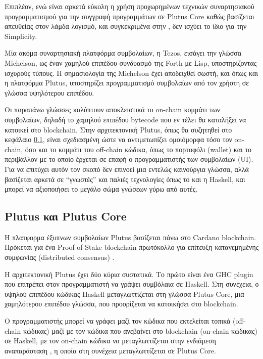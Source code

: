 Επιπλέον, ενώ είναι αρκετά εύκολη η χρήση προχωρημένων τεχνικών συναρτησιακού
προγραμματισμού για την συγγραφή προγραμμάτων σε Plutus Core καθώς βασίζεται
απευθείας στον λάμδα λογισμό, και συγκεκριμένα στην \FOM{}, δεν ισχύει το ίδιο
για την Simplicity.

Μία ακόμα συναρτησιακή πλατφόρμα συμβολαίων, η Tezos, εισάγει την γλώσσα
Michelson, ως έναν χαμηλού επιπέδου συνδυασμό της Forth με Lisp, υποστηρίζοντας
ισχυρούς τύπους.  Η σημασιολογία της Michelson έχει αποδειχθεί σωστή, και όπως
και η πλατφόρμα Plutus, υποστηρίζει προγραμματισμό συμβολαίων από τον χρήστη σε
γλώσσα υψηλότερου επιπέδου.

Οι παραπάνω γλώσσες καλύπτουν αποκλειστικά το on-chain κομμάτι των συμβολαίων,
δηλαδή το χαμηλού επιπέδου bytecode που εν τέλει θα καταλήξει να κατοικεί στο
blockchain. Στην αρχιτεκτονική Plutus, όπως θα συζητηθεί στο κεφάλαιο
\ref{subsec:plutus}, είναι σχεδιασμένη ώστε να αντιμετωπίζει ομοιόμορφα τόσο
τον on-chain, όσο και το κομμάτι του off-chain κώδικα, όπως το πορτοφόλι
(wallet) και το περιβάλλον με το οποίο έρχεται σε επαφή ο προγραμματιστής των
συμβολαίων (UI). Για να επιτύχει αυτόν τον σκοπό δεν επινοεί μια εντελώς
καινούργια γλώσσα, αλλά βασίζεται αρκετά σε ``γνωστές'' και παλιές τεχνολογίες
όπως το \FOM και η Haskell, και μπορεί να αξιοποιήσει το μεγάλο σώμα γνώσεων
γύρω από αυτές.

\subsection{Plutus και Plutus Core} \label{subsec:plutus}

Η πλατφορμα έξυπνων συμβολαίων Plutus βασίζεται πάνω στο Cardano blockchain.
Πρόκεται για ένα Proof-of-Stake blockchain πρωτόκολλο για επίτευξη
κατανεμημένης συμφωνίας (distributed consensus) \cite{ouroboros}.

Η αρχιτεκτονική Plutus έχει δύο κύρια συστατικά. Το πρώτο είναι ένα GHC plugin
που επιτρέπει στον προγραμματιστή να γράψει συμβόλαια σε Haskell.  Στη
συνέχεια, ο υψηλού επιπέδου κώδικας Haskell μεταγλωττίζεται στη γλώσσα Plutus
Core, μια χαμηλότερου επιπέδου γλώσσα, που προορίζεται να κατοικήσει στο
blockchain.

Ο προγραμματιστής μπορεί να γράφει μαζί τον κώδικα που εκτελείται τοπικά
(off-chain κώδικας) μαζί με τον κώδικα που ανεβαίνει στο blockchain (on-chain
κώδικας) σε Haskell, με τον on-chain κώδικα να μεταγλωττίζεται στην ενδιάμεση
αναπαράσταση \FIR{},  η οποία στη συνέχεια μεταγλωττίζεται σε Plutus Core.

